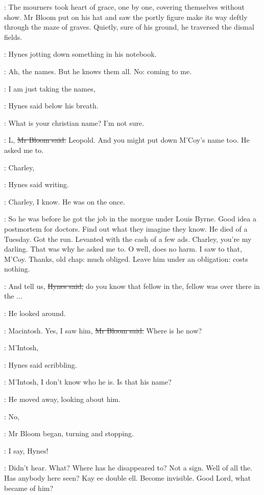 :
The mourners took heart of grace,
one by one, covering themselves without show.
Mr Bloom put on his hat
and saw the portly figure make its way deftly through the maze of graves.
Quietly, sure of his ground,
he traversed the dismal fields.

:
Hynes jotting down something in his notebook.

\BloomInt:
Ah, the names.
But he knows them all.
No:
coming to me.

\hynes:
I am just taking the names,

:
Hynes said below his breath.

\hynes:
What is your christian name?
I'm not sure.

\Bloom:
L,
\sout{Mr Bloom said.}
Leopold.
And you might put down M'Coy's name too.
He asked me to.

\hynes:
Charley,

:
Hynes said writing.

\hynes:
Charley,
I know.
He was on the  once.

\BloomInt:
So he was before he got the job in the morgue under Louis Byrne.
Good idea a postmortem for doctors.
Find out what they imagine they know.
He died of a Tuesday.
Got the run.
Levanted with the cash of a few ads.
Charley, you're my darling.
That was why he asked me to.
O well, does no harm.
I saw to that, M'Coy.
Thanks, old chap:
much obliged.
Leave him under an obligation:
costs nothing.

\hynes:
And tell us,
\sout{Hynes said,}
do you know that fellow in the,
fellow was over there in the ...

:
He looked around.

\Bloom:
Macintosh.
Yes, I saw him,
\sout{Mr Bloom said.}
Where is he now?

\hynes:
M'Intosh,

:
Hynes said scribbling.

\hynes:
M'Intosh,
I don't know who he is.
Is that his name?

:
He moved away, looking about him.

\Bloom:
No,

:
Mr Bloom began, turning and stopping.

\Bloom:
I say, Hynes!

\BloomInt:
Didn't hear.
What?
Where has he disappeared to?
Not a sign.
Well of all the.
Has anybody here seen?
Kay ee double ell.
Become invisible.
Good Lord, what became of him?

